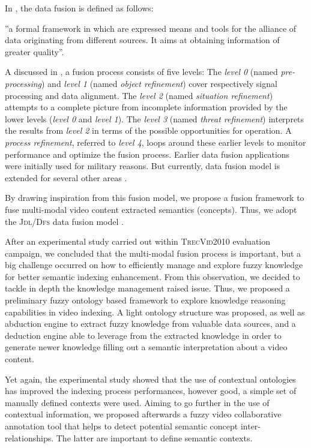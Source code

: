 	In \citep{Lucien1999}, the data fusion is defined as follows:
		\begin{definition}
			''a formal framework in
 		which are expressed means and tools for the alliance of
 		data originating from different sources. It aims at obtaining
 		information of greater quality''.
	\end{definition}

	A discussed in \citep{Waltz1990,Esteban2005,Blasch2006,Guerrero2009}, a fusion process 
	consists of five levels: The \emph{level 0} (named  \emph{pre-processing}) and \emph{level 1}
	(named \emph{object refinement}) cover respectively signal processing and data alignment. 
	The \emph{level 2} (named \emph{situation refinement}) attempts to  a complete picture 
	from incomplete information provided by the lower levels (\emph{level 0} and \emph{level 1}).
	The \emph{level 3} (named \emph{threat refinement}) interprets the results from \emph{level 2} 
	in terms of the possible opportunities for operation. A \emph{process refinement},
	referred to \emph{level 4}, loops around these earlier levels to monitor performance 
 	and optimize the fusion process. Earlier data fusion applications were initially used for
	military reasons. But currently, data fusion model is extended for several other 
	areas \citep{LigginsII2008}.

	By drawing inspiration from this fusion model, we propose a fusion framework to fuse 
	multi-modal video content extracted semantics (concepts). Thus, we adopt the
	\textsc{Jdl/Dfs} data fusion model \citep{Waltz1990}.

	After an experimental study carried out within \textsc{TrecVid2010} evaluation campaign,
	we concluded that the multi-modal fusion process is important, but a big challenge occurred on 
	how to efficiently manage and explore fuzzy knowledge for better semantic indexing enhancement. 
	From this observation, we decided to tackle in depth the knowledge management raised issue. 
	Thus, we proposed a preliminary fuzzy ontology based framework to explore knowledge reasoning 
	capabilities in video indexing. A light ontology structure was proposed, as well as  abduction 
	engine to extract fuzzy knowledge from valuable data sources, and a deduction engine able to 
	leverage from the extracted knowledge in order to generate newer knowledge filling out a semantic
	interpretation about a video content.

	Yet again, the experimental study showed that the use of contextual ontologies has improved 
	the indexing process performances, however good, a simple set of manually defined contexts 
	were used. Aiming to go further in the use of contextual information, we proposed afterwards 
	a fuzzy video collaborative annotation tool that helps to detect potential semantic concept 
	inter-relationships. The latter are important to define semantic contexts.
		
